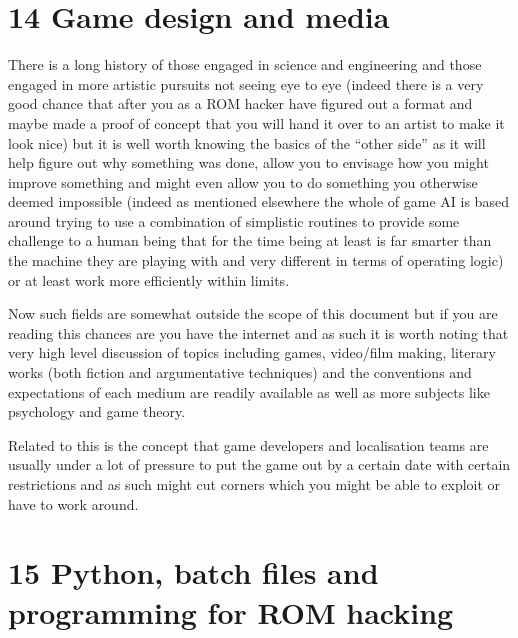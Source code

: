 \documentclass[
]{book}
\begin{document}
\hypertarget{game-design-and-media}{%
\chapter{14 Game design and media}\label{game-design-and-media}}

There is a long history of those engaged in science and engineering and those engaged in more artistic pursuits not seeing eye to eye (indeed there is a very good chance that after you as a ROM hacker have figured out a format and maybe made a proof of concept that you will hand it over to an artist to make it look nice) but it is well worth knowing the basics of the ``other side'' as it will help figure out why something was done, allow you to envisage how you might improve something and might even allow you to do something you otherwise deemed impossible (indeed as mentioned elsewhere the whole of game AI is based around trying to use a combination of simplistic routines to provide some challenge to a human being that for the time being at least is far smarter than the machine they are playing with and very different in terms of operating logic) or at least work more efficiently within limits.

Now such fields are somewhat outside the scope of this document but if you are reading this chances are you have the internet and as such it is worth noting that very high level discussion of topics including games, video/film making, literary works (both fiction and argumentative techniques) and the conventions and expectations of each medium are readily available as well as more subjects like psychology and game theory.

Related to this is the concept that game developers and localisation teams are usually under a lot of pressure to put the game out by a certain date with certain restrictions and as such might cut corners which you might be able to exploit or have to work around.

\hypertarget{python-batch-files-and-programming-for-rom-hacking}{%
\chapter{15 Python, batch files and programming for ROM hacking}\label{python-batch-files-and-programming-for-rom-hacking}}
\end{document}
